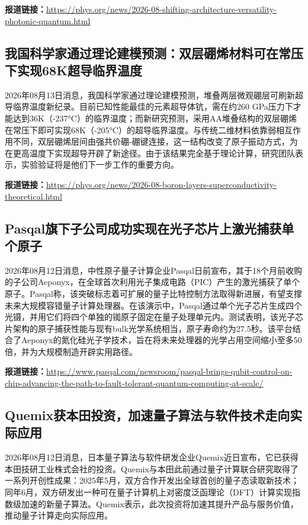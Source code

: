 \documentclass[12pt,a4paper]{ctexart}
\begin{document}
\noindent\textbf{报道链接：}\url{https://phys.org/news/2026-08-shifting-architecture-versatility-photonic-quantum.html}

\subsection{ 我国科学家通过理论建模预测：双层硼烯材料可在常压下实现68K超导临界温度 }

2026年08月13日消息，我国科学家通过理论建模预测，堆叠两层微观硼层可刷新超导临界温度新纪录。目前已知性能最佳的元素超导体钪，需在约260 GPa压力下才能达到36K（-237°C）的临界温度；而新研究预测，采用AA堆叠结构的双层硼烯在常压下即可实现68K（-205°C）的超导临界温度。与传统二维材料依靠弱相互作用不同，双层硼烯层间由强共价硼-硼键连接，这一结构改变了原子振动方式，为在更高温度下实现超导开辟了新途径。由于该结果完全基于理论计算，研究团队表示，实验验证将是他们下一步工作的重要方向。

\noindent\textbf{报道链接：}\url{https://phys.org/news/2026-08-boron-layers-superconductivity-theoretical.html}

\subsection{ Pasqal旗下子公司成功实现在光子芯片上激光捕获单个原子 }

2026年08月12日消息，中性原子量子计算企业Pasqal日前宣布，其于18个月前收购的子公司Aeponyx，在全球首次利用光子集成电路（PIC）产生的激光捕获了单个原子。Pasqal称，该突破标志着可扩展的量子比特控制方法取得新进展，有望支撑未来大规模容错量子计算处理器。在该演示中，Pasqal通过单个光子芯片生成四个光镊，并用它们将四个单独的铷原子固定在量子处理单元内。测试表明，该光子芯片架构的原子捕获性能与现有bulk光学系统相当，原子寿命约为27.5秒。该平台结合了Aeponyx的氮化硅光子学技术，旨在将未来处理器的光学占用空间缩小至多50倍，并为大规模制造开辟实用路径。

\noindent\textbf{报道链接：}\url{https://www.pasqal.com/newsroom/pasqal-brings-qubit-control-on-chip-advancing-the-path-to-fault-tolerant-quantum-computing-at-scale/}

\subsection{ Quemix获本田投资，加速量子算法与软件技术走向实际应用 }

2026年08月12日消息，日本量子算法与软件研发企业Quemix近日宣布，它已获得本田技研工业株式会社的投资。Quemix与本田此前通过量子计算联合研究取得了一系列开创性成果：2025年5月，双方合作开发出全球首创的量子态读取新技术；同年6月，双方研发出一种可在量子计算机上对密度泛函理论（DFT）计算实现指数级加速的新量子算法。Quemix表示，此次投资将加速其提升产品与服务价值，推动量子计算走向实际应用。
\end{document}
